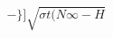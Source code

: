 \documentclass[11pt,a4paper]{article}
\begin{document}
\[
 - \} ] \sqrt{ \sigma t ( N \infty - H }
\]
\end{document}
